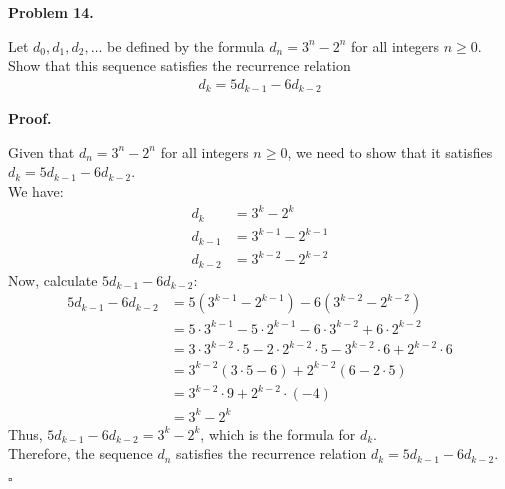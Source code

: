 \documentclass{article}
\newenvironment{problem}[1]{
    \begin{mdframed}[backgroundcolor=gray!20, skipabove=\baselineskip, skipbelow=\baselineskip, nobreak=true, innerleftmargin=10pt, innerrightmargin=10pt, innertopmargin=10pt, innerbottommargin=10pt]
    \textbf{Problem #1.}
}{
    \end{mdframed}
}
\newenvironment{proof}{
    \begin{mdframed}[nobreak=false, innerleftmargin=10pt, innerrightmargin=10pt, innertopmargin=10pt, innerbottommargin=10pt]
    \textbf{Proof.}
}{
    \hfill $\square$
    \end{mdframed}
}
\begin{document}
    \begin{problem}{14}
        Let $d_0, d_1, d_2, \ldots$ be defined by the formula $d_n = 3^n - 2^n$ for all integers $n \geq 0$. Show that this sequence satisfies the recurrence relation
        \begin{align*}
            d_k = 5d_{k-1} - 6d_{k-2}
        \end{align*}
    \end{problem}
    \begin{proof}
        Given that $d_n = 3^n - 2^n$ for all integers $n \geq 0$, we need to show that it satisfies $d_k = 5d_{k-1} - 6d_{k-2}$. \\
        We have:
        \begin{align*}
            d_k &= 3^k - 2^k \\
            d_{k-1} &= 3^{k-1} - 2^{k-1} \\
            d_{k-2} &= 3^{k-2} - 2^{k-2}
        \end{align*}
        Now, calculate $5d_{k-1} - 6d_{k-2}$:
        \begin{align*}
            5d_{k-1} - 6d_{k-2} &= 5(3^{k-1} - 2^{k-1}) - 6(3^{k-2} - 2^{k-2}) \\
            &= 5 \cdot 3^{k-1} - 5 \cdot 2^{k-1} - 6 \cdot 3^{k-2} + 6 \cdot 2^{k-2} \\
            &= 3 \cdot 3^{k-2} \cdot 5 - 2 \cdot 2^{k-2} \cdot 5 - 3^{k-2} \cdot 6 + 2^{k-2} \cdot 6 \\
            &= 3^{k-2} (3 \cdot 5 - 6) + 2^{k-2} (6 - 2 \cdot 5) \\
            &= 3^{k-2} \cdot 9 + 2^{k-2} \cdot (-4) \\
            &= 3^k - 2^k
        \end{align*}
        Thus, $5d_{k-1} - 6d_{k-2} = 3^k - 2^k$, which is the formula for $d_k$. \\
        Therefore, the sequence $d_n$ satisfies the recurrence relation $d_k = 5d_{k-1} - 6d_{k-2}$.
    \end{proof}
    
\end{document}
